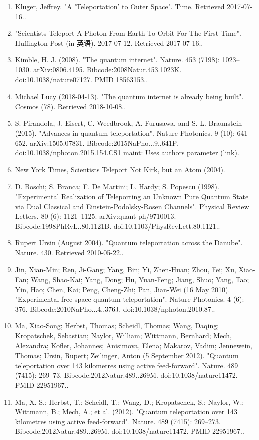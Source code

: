 \begin{enumerate}
\item Kluger, Jeffrey. "A 'Teleportation' to Outer Space". Time. Retrieved 2017-07-16..
\item "Scientists Teleport A Photon From Earth To Orbit For The First Time". Huffington Post (in 英语). 2017-07-12. Retrieved 2017-07-16..
\item Kimble, H. J. (2008). "The quantum internet". Nature. 453 (7198): 1023–1030. arXiv:0806.4195. Bibcode:2008Natur.453.1023K. doi:10.1038/nature07127. PMID 18563153..
\item Michael Lucy (2018-04-13). "The quantum internet is already being built". Cosmos (78). Retrieved 2018-10-08..
\item S. Pirandola, J. Eisert, C. Weedbrook, A. Furusawa, and S. L. Braunstein (2015). "Advances in quantum teleportation". Nature Photonics. 9 (10): 641–652. arXiv:1505.07831. Bibcode:2015NaPho...9..641P. doi:10.1038/nphoton.2015.154.CS1 maint: Uses authors parameter (link).
\item New York Times, Scientists Teleport Not Kirk, but an Atom (2004).
\item D. Boschi; S. Branca; F. De Martini; L. Hardy; S. Popescu (1998). "Experimental Realization of Teleporting an Unknown Pure Quantum State via Dual Classical and Einstein-Podolsky-Rosen Channels". Physical Review Letters. 80 (6): 1121–1125. arXiv:quant-ph/9710013. Bibcode:1998PhRvL..80.1121B. doi:10.1103/PhysRevLett.80.1121..
\item Rupert Ursin (August 2004). "Quantum teleportation across the Danube". Nature. 430. Retrieved 2010-05-22..
\item Jin, Xian-Min; Ren, Ji-Gang; Yang, Bin; Yi, Zhen-Huan; Zhou, Fei; Xu, Xiao-Fan; Wang, Shao-Kai; Yang, Dong; Hu, Yuan-Feng; Jiang, Shuo; Yang, Tao; Yin, Hao; Chen, Kai; Peng, Cheng-Zhi; Pan, Jian-Wei (16 May 2010). "Experimental free-space quantum teleportation". Nature Photonics. 4 (6): 376. Bibcode:2010NaPho...4..376J. doi:10.1038/nphoton.2010.87..
\item Ma, Xiao-Song; Herbst, Thomas; Scheidl, Thomas; Wang, Daqing; Kropatschek, Sebastian; Naylor, William; Wittmann, Bernhard; Mech, Alexandra; Kofler, Johannes; Anisimova, Elena; Makarov, Vadim; Jennewein, Thomas; Ursin, Rupert; Zeilinger, Anton (5 September 2012). "Quantum teleportation over 143 kilometres using active feed-forward". Nature. 489 (7415): 269–73. Bibcode:2012Natur.489..269M. doi:10.1038/nature11472. PMID 22951967..
\item Ma, X. S.; Herbst, T.; Scheidl, T.; Wang, D.; Kropatschek, S.; Naylor, W.; Wittmann, B.; Mech, A.; et al. (2012). "Quantum teleportation over 143 kilometres using active feed-forward". Nature. 489 (7415): 269–273. Bibcode:2012Natur.489..269M. doi:10.1038/nature11472. PMID 22951967..

\end{enumerate}
